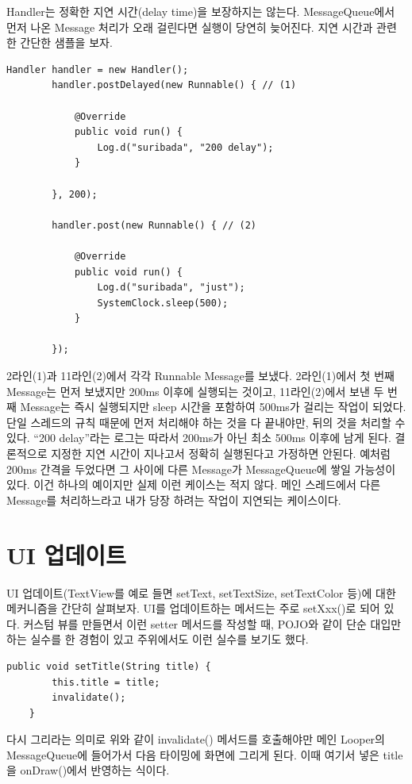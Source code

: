 Handler는 정확한 지연 시간(delay time)을 보장하지는 않는다. MessageQueue에서 먼저 나온 Message 처리가 오래 걸린다면 실행이 당연히 늦어진다. 지연 시간과 관련한 간단한 샘플을 보자.
\begin{lstlisting}[frame=single, caption=부정확한 지연시간] 
		Handler handler = new Handler();
		handler.postDelayed(new Runnable() { // (1)

			@Override
			public void run() {
				Log.d("suribada", "200 delay");
			}
			
		}, 200);
		
		handler.post(new Runnable() { // (2)

			@Override
			public void run() {
				Log.d("suribada", "just");
				SystemClock.sleep(500);
			}
			
		});
\end{lstlisting}
2라인(1)과 11라인(2)에서 각각 Runnable Message를 보냈다. 2라인(1)에서 첫 번째 Message는 먼저 보냈지만 200ms 이후에 실행되는 것이고, 11라인(2)에서 보낸 두 번째 Message는 즉시 실행되지만 sleep 시간을 포함하여 500ms가 걸리는 작업이 되었다. 
단일 스레드의 규칙 때문에 먼저 처리해야 하는 것을 다 끝내야만, 뒤의 것을 처리할 수 있다. ``200 delay''라는 로그는 따라서 200ms가 아닌 최소 500ms 이후에 남게 된다.
결론적으로 지정한 지연 시간이 지나고서 정확히 실행된다고 가정하면 안된다. 예처럼 200ms 간격을 두었다면 그 사이에 다른 Message가 MessageQueue에 쌓일 가능성이 있다.
이건 하나의 예이지만 실제 이런 케이스는 적지 않다. 메인 스레드에서 다른 Message를 처리하느라고 내가 당장 하려는 작업이 지연되는 케이스이다.\\

\section{UI 업데이트}
UI 업데이트(TextView를 예로 들면 setText, setTextSize, setTextColor 등)에 대한 메커니즘을 간단히 살펴보자.
UI를 업데이트하는 메서드는 주로 setXxx()로 되어 있다. 커스텀 뷰를 만들면서 이런 setter 메서드를 작성할 때, POJO와 같이 단순 대입만 하는 실수를 한 경험이 있고 주위에서도 이런 실수를 보기도 했다. 
\begin{lstlisting}[frame=single]
	public void setTitle(String title) {
		this.title = title;
		invalidate();
	}
\end{lstlisting}
다시 그리라는 의미로 위와 같이 invalidate() 메서드를 호출해야만 메인 Looper의 MessageQueue에 들어가서 다음 타이밍에 화면에 그리게 된다. 이때 여기서 넣은 title을 onDraw()에서 반영하는 식이다.\\

